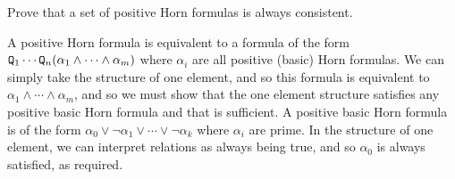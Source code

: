 \bexerc

    Prove that a set of positive Horn formulas is always consistent.

\eexerc

A positive Horn formula is equivalent to a formula of the form ${\tt Q}_1\cdots{\tt Q}_n(\alpha_1\land\cdots\land\alpha_m)$ where $\alpha_i$ are all positive (basic) Horn formulas.
We can simply take the structure of one element, and so this formula is equivalent to $\alpha_1\land\cdots\land\alpha_m$, and so we must show that the one element structure satisfies any positive basic
Horn formula and that is sufficient.
A positive basic Horn formula is of the form $\alpha_0\lor\neg\alpha_1\lor\cdots\lor\neg\alpha_k$ where $\alpha_i$ are prime.
In the structure of one element, we can interpret relations as always being true, and so $\alpha_0$ is always satisfied, as required.

